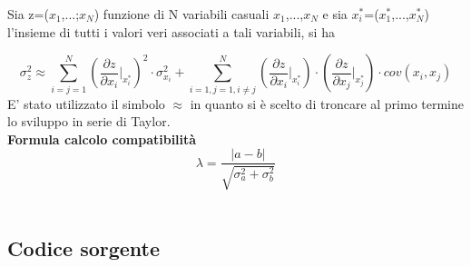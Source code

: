 \documentclass[a4paper,11pt,oneside]{article}
\begin{document}
Sia z=($x_1$,...;$x_N$) funzione di N variabili casuali $x_1$,...,$x_N$ e sia ${x_i^\ast}$=($x_1^\ast$,...,$x_N^{\ast}$) l'insieme di tutti i valori veri associati a tali variabili, si ha 

\begin{equation*}
    \sigma_z^{2}\approx  \sum_{i=j=1}^{N}\left ( \frac{\partial z}{\partial x_i}\Big|_{x_i^{\ast}} \right )^{2}\cdot\sigma_{x_i}^{2} +\sum_{i=1,j=1,i\neq j}^{N}\left (\frac{\partial z }{\partial x_i}\Big|_{x_i^{\ast}} \right ) \cdot \left ( \frac{\partial z}{\partial x_j} \Big|_{x_j^{\ast}} \right )\cdot cov(x_i,x_j)\label{eq:prop_errori}
\end{equation*}
E' stato utilizzato il simbolo $\approx$ in quanto si è scelto di troncare al primo termine lo sviluppo in serie di Taylor.\\


\textbf{Formula calcolo compatibilità}\\
\begin{equation*}
    \lambda=\frac{\left|a-b\right|}{\sqrt{\sigma^{2}_{a}+\sigma^{2}_{b}}}
\end{equation*}\\

\subsection{Codice sorgente}
\end{document}
